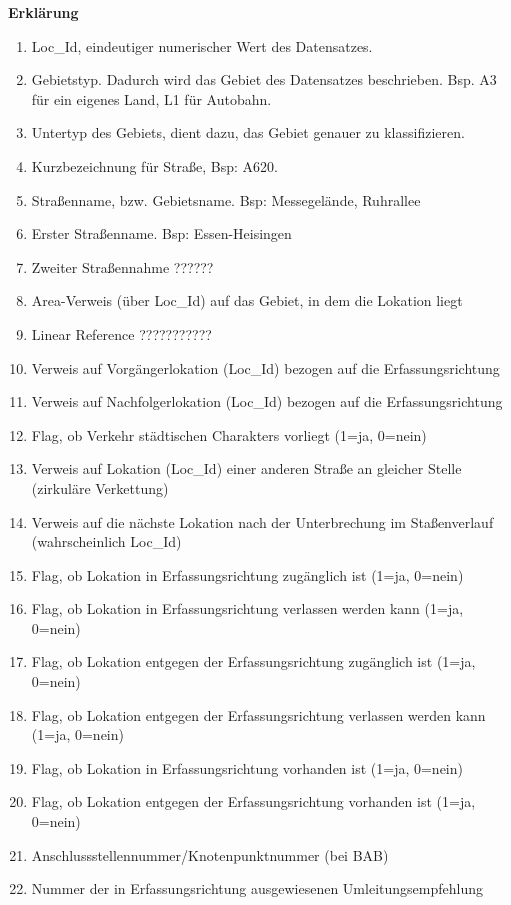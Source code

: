 \documentclass[12pt, a4paper, ngerman]{article}
\begin{document}
\textbf{Erklärung}
\begin{enumerate}
	\item Loc\_Id, eindeutiger numerischer Wert des Datensatzes.
	\item Gebietstyp. Dadurch wird das Gebiet des Datensatzes beschrieben. Bsp. A3 für ein eigenes Land, L1 für Autobahn.
	\item  Untertyp des Gebiets, dient dazu, das Gebiet genauer zu klassifizieren.
	\item Kurzbezeichnung für Straße, Bsp: A620.
	\item Straßenname, bzw. Gebietsname. Bsp: Messegelände, Ruhrallee
	\item Erster Straßenname. Bsp: Essen-Heisingen
	\item Zweiter Straßennahme ??????
	\item Area-Verweis (über Loc\_Id) auf das Gebiet, in dem die Lokation liegt
	\item Linear Reference ???????????
	\item Verweis auf Vorgängerlokation (Loc\_Id) bezogen auf die Erfassungsrichtung
	\item Verweis auf Nachfolgerlokation (Loc\_Id) bezogen auf die Erfassungsrichtung
	\item Flag, ob Verkehr städtischen Charakters vorliegt (1=ja, 0=nein)
	\item Verweis auf Lokation (Loc\_Id) einer anderen Straße an gleicher Stelle (zirkuläre Verkettung)
	\item Verweis auf die nächste Lokation nach der Unterbrechung im Staßenverlauf (wahrscheinlich Loc\_Id)
	\item Flag, ob Lokation in Erfassungsrichtung zugänglich ist (1=ja, 0=nein)
	\item Flag, ob Lokation in Erfassungsrichtung verlassen werden kann (1=ja, 0=nein)
	\item Flag, ob Lokation entgegen der Erfassungsrichtung zugänglich ist (1=ja, 0=nein)
	\item Flag, ob Lokation entgegen der Erfassungsrichtung verlassen werden kann (1=ja, 0=nein)
	\item Flag, ob Lokation in Erfassungsrichtung vorhanden ist (1=ja, 0=nein)
	\item Flag, ob Lokation entgegen der Erfassungsrichtung vorhanden ist (1=ja, 0=nein)
	\item Anschlussstellennummer/Knotenpunktnummer (bei BAB)
	\item Nummer der in Erfassungsrichtung ausgewiesenen Umleitungsempfehlung

\end{enumerate}
\end{document}
